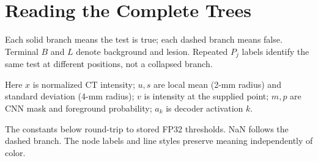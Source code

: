 \section{Reading the Complete Trees}
Each solid branch means the test is true; each dashed branch means false. Terminal $B$ and $L$ denote background and lesion. Repeated $P_j$ labels identify the same test at different positions, not a collapsed branch.\par\smallskip
Here $x$ is normalized CT intensity; $u,s$ are local mean (2-mm radius) and standard deviation (4-mm radius); $v$ is intensity at the supplied point; $m,p$ are CNN mask and foreground probability; $a_k$ is decoder activation $k$.\par\smallskip
The constants below round-trip to stored FP32 thresholds. NaN follows the dashed branch. The node labels and line styles preserve meaning independently of color.\par
{}

